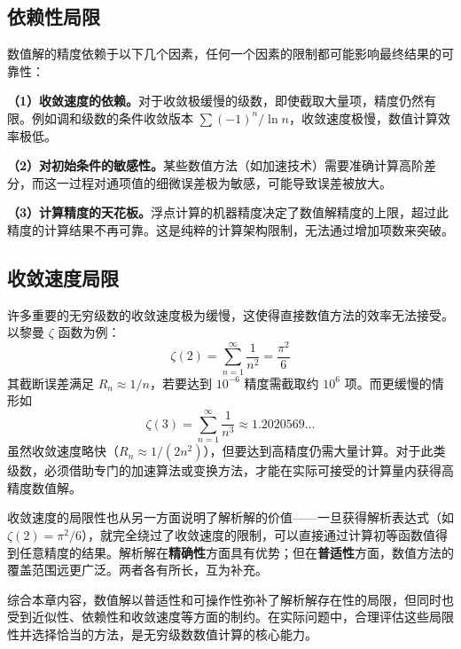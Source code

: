 \subsection{依赖性局限}

数值解的精度依赖于以下几个因素，任何一个因素的限制都可能影响最终结果的可靠性：

\textbf{（1）收敛速度的依赖。}对于收敛极缓慢的级数，即使截取大量项，精度仍然有限。例如调和级数的条件收敛版本 $\displaystyle \sum(-1)^n/\ln n$，收敛速度极慢，数值计算效率极低。

\textbf{（2）对初始条件的敏感性。}某些数值方法（如加速技术）需要准确计算高阶差分，而这一过程对通项值的细微误差极为敏感，可能导致误差被放大。

\textbf{（3）计算精度的天花板。}浮点计算的机器精度决定了数值解精度的上限，超过此精度的计算结果不再可靠。这是纯粹的计算架构限制，无法通过增加项数来突破。

\subsection{收敛速度局限}

许多重要的无穷级数的收敛速度极为缓慢，这使得直接数值方法的效率无法接受。以黎曼 $\zeta$ 函数为例：
\begin{equation}
\zeta(2) = \sum_{n=1}^{\infty} \frac{1}{n^2} = \frac{\pi^2}{6}
\end{equation}
其截断误差满足 $R_n \approx 1/n$，若要达到 $10^{-6}$ 精度需截取约 $10^6$ 项。而更缓慢的情形如
\begin{equation}
\zeta(3) = \sum_{n=1}^{\infty} \frac{1}{n^3} \approx 1.2020569\ldots
\end{equation}
虽然收敛速度略快（$R_n \approx 1/(2n^2)$），但要达到高精度仍需大量计算。对于此类级数，必须借助专门的加速算法或变换方法，才能在实际可接受的计算量内获得高精度数值解。

收敛速度的局限性也从另一方面说明了解析解的价值——一旦获得解析表达式（如 $\zeta(2) = \pi^2/6$），就完全绕过了收敛速度的限制，可以直接通过计算初等函数值得到任意精度的结果。解析解在\textbf{精确性}方面具有优势；但在\textbf{普适性}方面，数值方法的覆盖范围远更广泛。两者各有所长，互为补充。

综合本章内容，数值解以普适性和可操作性弥补了解析解存在性的局限，但同时也受到近似性、依赖性和收敛速度等方面的制约。在实际问题中，合理评估这些局限性并选择恰当的方法，是无穷级数数值计算的核心能力。
